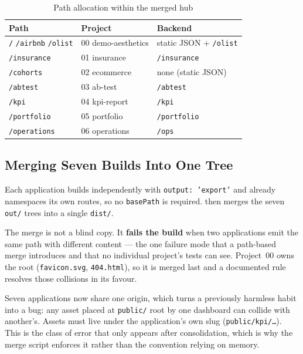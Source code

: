 \begin{table}[h]
\centering
\caption{Path allocation within the merged hub}
\label{tab:hub-paths}
\begin{tabular}{lll}
\toprule
\textbf{Path} & \textbf{Project} & \textbf{Backend} \\
\midrule
\texttt{/} \texttt{/airbnb} \texttt{/olist} & 00 demo-aesthetics & static JSON + \texttt{/olist} \\
\texttt{/insurance}  & 01 insurance   & \texttt{/insurance} \\
\texttt{/cohorts}    & 02 ecommerce   & none (static JSON) \\
\texttt{/abtest}     & 03 ab-test     & \texttt{/abtest} \\
\texttt{/kpi}        & 04 kpi-report  & \texttt{/kpi} \\
\texttt{/portfolio}  & 05 portfolio   & \texttt{/portfolio} \\
\texttt{/operations} & 06 operations  & \texttt{/ops} \\
\bottomrule
\end{tabular}
\end{table}

\subsection{Merging Seven Builds Into One Tree}

Each application builds independently with \texttt{output: 'export'} and already
namespaces its own routes, so no \texttt{basePath} is required.
 then merges the seven \texttt{out/} trees into a
single \texttt{dist/}.

The merge is not a blind copy. It \textbf{fails the build} when two applications
emit the same path with different content --- the one failure mode that a
path-based merge introduces and that no individual project's tests can see.
Project~00 owns the root (\texttt{favicon.svg}, \texttt{404.html}), so it is
merged last and a documented rule resolves those collisions in its favour.

\begin{keyinsight}
Seven applications now share one origin, which turns a previously harmless habit
into a bug: any asset placed at \texttt{public/} root by one dashboard can
collide with another's. Assets must live under the application's own slug
(\texttt{public/kpi/\ldots}). This is the class of error that only appears after
consolidation, which is why the merge script enforces it rather than the
convention relying on memory.
\end{keyinsight}

